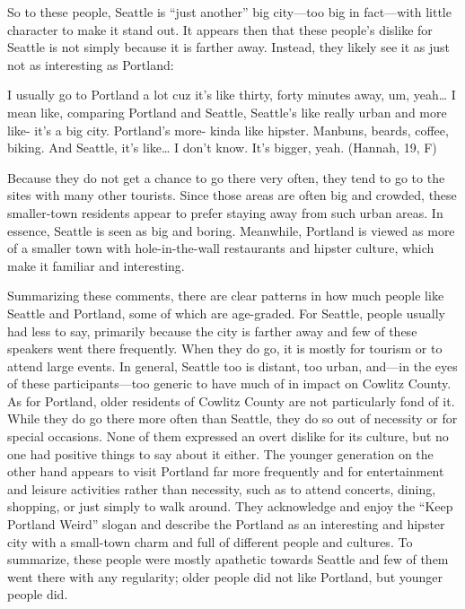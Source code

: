 So to these people, Seattle is ``just another'' big city---too big in fact---with little character to make it stand out. It appears then that these people's dislike for Seattle is not simply because it is farther away. Instead, they likely see it as just not as interesting as Portland:
\begin{num_quote}
    I usually go to Portland a lot cuz it's like thirty, forty minutes away, um, yeah… I mean like, comparing Portland and Seattle, Seattle's like really urban and more like- it's a big city. Portland's more- kinda like hipster. Manbuns, beards, coffee, biking. And Seattle, it's like… I don't know. It's bigger, yeah. (Hannah, 19, F)
    \label{quote:seattle_is_far}
\end{num_quote}
Because they do not get a chance to go there very often, they tend to go to the sites with many other tourists. Since those areas are often big and crowded, these smaller-town residents appear to prefer staying away from such urban areas. In essence, Seattle is seen as big and boring. Meanwhile, Portland is viewed as more of a smaller town with hole-in-the-wall restaurants and hipster culture, which make it familiar and interesting.

Summarizing these comments, there are clear patterns in how much people like Seattle and Portland, some of which are age-graded. For Seattle, people usually had less to say, primarily because the city is farther away and few of these speakers went there frequently. When they do go, it is mostly for tourism or to attend large events. In general, Seattle too is distant, too urban, and---in the eyes of these participants---too generic to have much of in impact on Cowlitz County. As for Portland, older residents of Cowlitz County are not particularly fond of it. While they do go there more often than Seattle, they do so out of necessity or for special occasions. None of them expressed an overt dislike for its culture, but no one had positive things to say about it either. The younger generation on the other hand appears to visit Portland far more frequently and for entertainment and leisure activities rather than necessity, such as to attend concerts, dining, shopping, or just simply to walk around. They acknowledge and enjoy the ``Keep Portland Weird'' slogan and describe the Portland as an interesting and hipster city with a small-town charm and full of different people and cultures. To summarize, these people were mostly apathetic towards Seattle and few of them went there with any regularity; older people did not like Portland, but younger people did.

